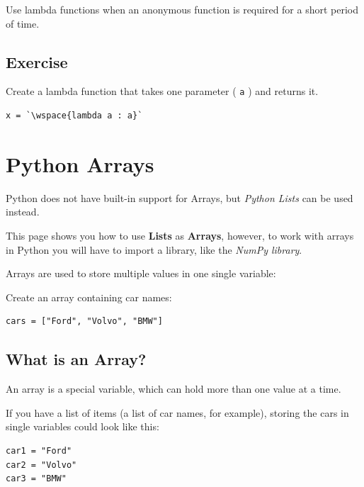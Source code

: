 \documentclass[12pt,a4paper]{article}
\newcommand{\wspace}[1]{%
	\color{white}\colorbox{white}{\texttt{#1}}%
}
\newcommand{\lcode}[1]{%
	\lstinline{#1}%
}
\begin{document}
\begin{nbox}
Use lambda functions when an anonymous function is required for a short period of time.
\end{nbox}
\subsection{Exercise}

\begin{tbox}
Create a lambda function that takes one parameter (\lcode{a}) and returns it.
	\begin{lstlisting}[numbers=none]
x = `\wspace{lambda a : a}`
	\end{lstlisting}
\end{tbox}
\vfill\newpage
\section{Python Arrays}\label{pyArrays}

\begin{nbox}
Python does not have built-in support for Arrays, but \textit{Python Lists}
can be used instead.
\end{nbox}

\begin{nbox}
This page shows you how to use \textbf{Lists} as \textbf{Arrays}, however,
to work with arrays in Python you will have to import a library, like the
\textit{NumPy library}.
\end{nbox}

Arrays are used to store multiple values in one single variable:

\begin{ebox}
Create an array containing car names:
	\begin{lstlisting}
cars = ["Ford", "Volvo", "BMW"]
	\end{lstlisting}
\end{ebox}

\subsection{What is an Array?}

An array is a special variable, which can hold more than one value at a time.

If you have a list of items (a list of car names, for example), storing the
cars in single variables could look like this:

\begin{lstlisting}
car1 = "Ford"
car2 = "Volvo"
car3 = "BMW"
\end{lstlisting}
\end{document}
